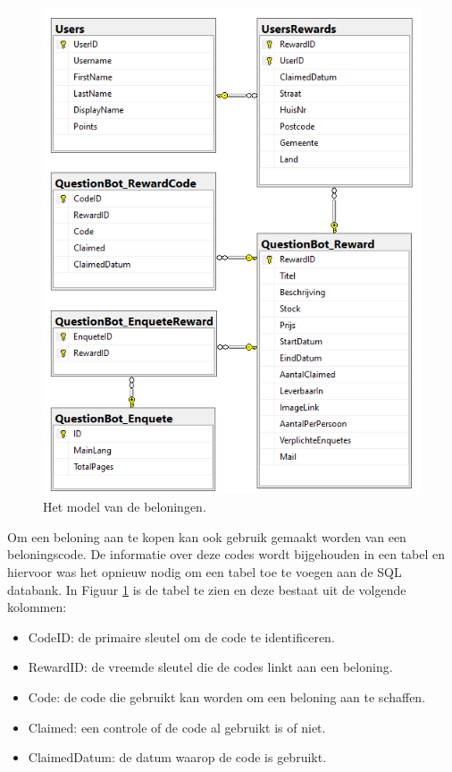 \begin{figure}
    \includegraphics[width=\linewidth]{DBDiagramReward.png}
    \caption{Het model van de beloningen.}
    \label{fig:dbdiagramreward}
\end{figure}

Om een beloning aan te kopen kan ook gebruik gemaakt worden van een beloningscode. De informatie over deze codes wordt bijgehouden in een tabel en hiervoor was het opnieuw nodig om een tabel toe te voegen aan de SQL databank. In Figuur \ref{fig:dbdiagramreward} is de tabel te zien en deze bestaat uit de volgende kolommen:

\begin{itemize}
    \item CodeID: de primaire sleutel om de code te identificeren.
    \item RewardID: de vreemde sleutel die de codes linkt aan een beloning.
    \item Code: de code die gebruikt kan worden om een beloning aan te schaffen.
    \item Claimed: een controle of de code al gebruikt is of niet.
    \item ClaimedDatum: de datum waarop de code is gebruikt.
\end{itemize}

